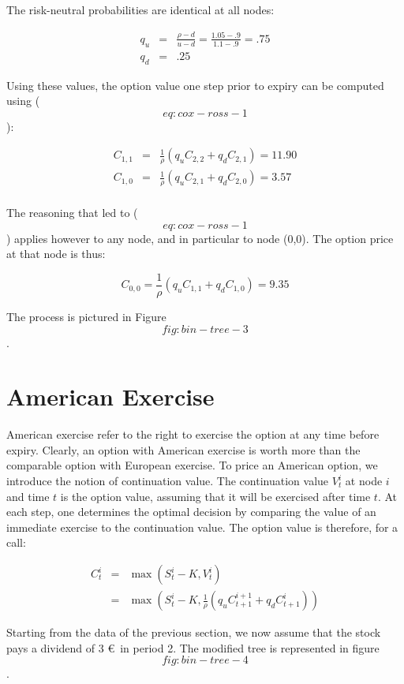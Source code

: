 \documentclass[justified]{tufte-book}
\begin{document}
The risk-neutral probabilities are identical at all nodes:

\[\begin{aligned}
    q_u &=& \frac{\rho-d}{u-d} = \frac{1.05-.9}{1.1-.9} = .75  \\
    q_d &=& .25\end{aligned}\]

Using these values, the option value one step prior to expiry can be
computed using (\[eq:cox-ross-1\]):

\[\begin{aligned}
C_{1,1} &=& \frac{1}{\rho}(q_u C_{2,2} + q_d C_{2,1}) = 11.90  \\
C_{1,0} &=& \frac{1}{\rho}(q_u C_{2,1} + q_d C_{2,0}) = 3.57 \\\end{aligned}\]

The reasoning that led to (\[eq:cox-ross-1\]) applies however to any
node, and in particular to node (0,0). The option price at that node is
thus:

\[C_{0,0} = \frac{1}{\rho}(q_u C_{1,1} + q_d C_{1,0}) = 9.35\]

The process is pictured in Figure~\[fig:bin-tree-3\].

\hypertarget{american-exercise}{%
\section{American Exercise}\label{american-exercise}}

American exercise refer to the right to exercise the option at any time
before expiry. Clearly, an option with American exercise is worth more
than the comparable option with European exercise. To price an American
option, we introduce the notion of continuation value. The continuation
value \(V^i_t\) at node \(i\) and time \(t\) is the option value, assuming
that it will be exercised after time \(t\). At each step, one determines
the optimal decision by comparing the value of an immediate exercise to
the continuation value. The option value is therefore, for a call:

\[\begin{aligned}
C^i_t  &=& \max(S^i_t - K, V^i_t) \\
       &=& \max(S^i_t-K, \frac{1}{\rho} (q_u C^{i+1}_{t+1} + q_d C^{i}_{t+1}))
     \end{aligned}\]

Starting from the data of the previous section, we now assume that the
stock pays a dividend of 3 €~in period 2. The modified tree is
represented in figure~\[fig:bin-tree-4\].
\end{document}
